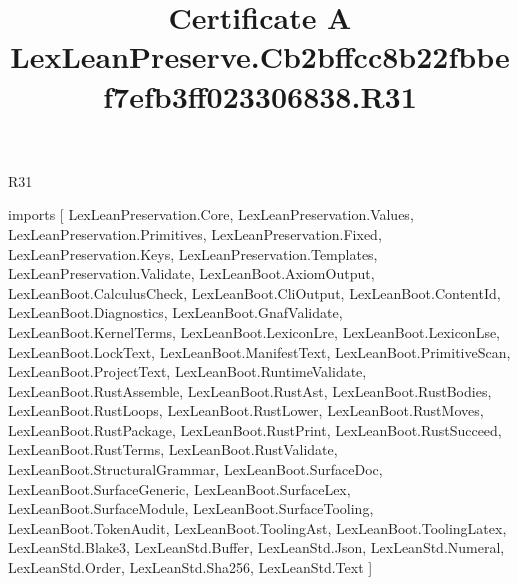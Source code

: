 \begin{lexlean}{R31}
\title{Certificate A LexLeanPreserve.Cb2bffcc8b22fbbef7efb3ff023306838.R31}
\begin{coremodule}
imports [
  LexLeanPreservation.Core,
  LexLeanPreservation.Values,
  LexLeanPreservation.Primitives,
  LexLeanPreservation.Fixed,
  LexLeanPreservation.Keys,
  LexLeanPreservation.Templates,
  LexLeanPreservation.Validate,
  LexLeanBoot.AxiomOutput,
  LexLeanBoot.CalculusCheck,
  LexLeanBoot.CliOutput,
  LexLeanBoot.ContentId,
  LexLeanBoot.Diagnostics,
  LexLeanBoot.GnafValidate,
  LexLeanBoot.KernelTerms,
  LexLeanBoot.LexiconLre,
  LexLeanBoot.LexiconLse,
  LexLeanBoot.LockText,
  LexLeanBoot.ManifestText,
  LexLeanBoot.PrimitiveScan,
  LexLeanBoot.ProjectText,
  LexLeanBoot.RuntimeValidate,
  LexLeanBoot.RustAssemble,
  LexLeanBoot.RustAst,
  LexLeanBoot.RustBodies,
  LexLeanBoot.RustLoops,
  LexLeanBoot.RustLower,
  LexLeanBoot.RustMoves,
  LexLeanBoot.RustPackage,
  LexLeanBoot.RustPrint,
  LexLeanBoot.RustSucceed,
  LexLeanBoot.RustTerms,
  LexLeanBoot.RustValidate,
  LexLeanBoot.StructuralGrammar,
  LexLeanBoot.SurfaceDoc,
  LexLeanBoot.SurfaceGeneric,
  LexLeanBoot.SurfaceLex,
  LexLeanBoot.SurfaceModule,
  LexLeanBoot.SurfaceTooling,
  LexLeanBoot.TokenAudit,
  LexLeanBoot.ToolingAst,
  LexLeanBoot.ToolingLatex,
  LexLeanStd.Blake3,
  LexLeanStd.Buffer,
  LexLeanStd.Json,
  LexLeanStd.Numeral,
  LexLeanStd.Order,
  LexLeanStd.Sha256,
  LexLeanStd.Text
]


\end{coremodule}
\end{lexlean}
